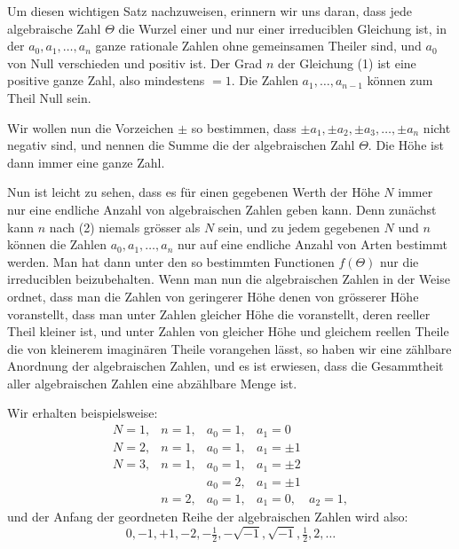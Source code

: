 Um diesen wichtigen Satz nachzuweisen, erinnern wir uns daran, dass jede algebraische Zahl $\Theta$ die Wurzel einer und nur einer irreduciblen Gleichung
ist, in der $a_0, a_1, \ldots, a_n$ ganze rationale Zahlen ohne gemeinsamen Theiler sind, und $a_0$ von Null verschieden und positiv ist. Der Grad $n$ der Gleichung (1) ist eine positive ganze Zahl, also mindestens $=1$. Die Zahlen $a_1, \ldots, a_{n-1}$ können zum Theil Null sein.

Wir wollen nun die Vorzeichen $\pm$ so bestimmen, dass $\pm a_1, \pm a_2, \pm a_3, \ldots, \pm a_n$ nicht negativ sind, und nennen die Summe
die  der algebraischen Zahl $\Theta$. Die Höhe ist dann immer eine  ganze Zahl.

Nun ist leicht zu sehen, dass es für einen gegebenen Werth der Höhe $N$ immer nur eine endliche Anzahl von algebraischen Zahlen geben kann. Denn zunächst kann $n$ nach (2) niemals grösser als $N$ sein, und zu jedem gegebenen $N$ und $n$ können die Zahlen $a_0, a_1, \ldots, a_n$ nur auf eine endliche Anzahl von Arten bestimmt werden. Man hat dann unter den so bestimmten Functionen $f(\Theta)$ nur die irreduciblen beizubehalten. Wenn man nun die algebraischen Zahlen in der Weise ordnet, dass man die Zahlen von geringerer Höhe denen von grösserer Höhe voranstellt, dass man unter Zahlen gleicher Höhe die voranstellt, deren reeller Theil kleiner ist, und unter Zahlen von gleicher Höhe und gleichem reellen Theile die von kleinerem imaginären Theile vorangehen lässt, so haben wir eine zählbare Anordnung der algebraischen Zahlen, und es ist erwiesen, dass die Gesammtheit aller algebraischen Zahlen eine abzählbare Menge ist.

Wir erhalten beispielsweise:
\[
\begin{array}{llll}
N=1, & n=1, & a_0=1, & a_1=0\\
N=2, & n=1, & a_0=1, & a_1=\pm 1\\
N=3, & n=1, & a_0=1, & a_1=\pm 2\\
     &      & a_0=2, & a_1=\pm 1\\
     & n=2, & a_0=1, & a_1=0, \quad a_2=1,
\end{array}
\]
und der Anfang der geordneten Reihe der algebraischen Zahlen wird also:
\[
0, -1, +1, -2, -\tfrac{1}{2}, -\sqrt{-1}, \sqrt{-1}, \tfrac{1}{2}, 2, \ldots
\]
